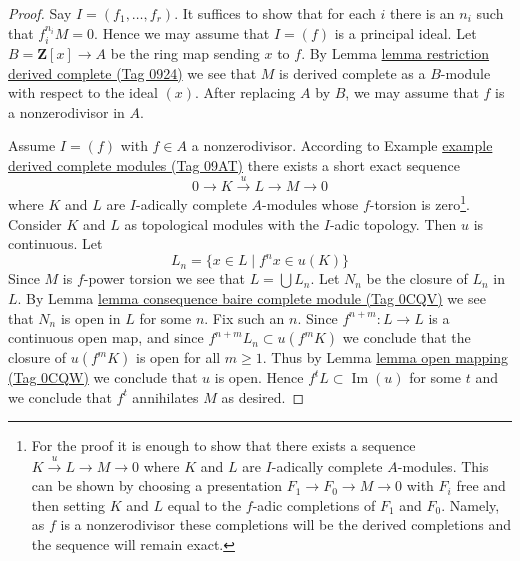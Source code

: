 \documentclass{amsart}
\theoremstyle{plain}
\theoremstyle{definition}
\theoremstyle{remark}
\numberwithin{equation}{subsection}
\def\Im{\mathop{\mathrm{Im}}}
\begin{document}
\begin{proof}
Say $I = (f_1, \ldots, f_r)$. It suffices to show
that for each $i$ there is an $n_i$ such that $f_i^{n_i}M = 0$.
Hence we may assume that $I = (f)$ is a principal ideal.
Let $B = \mathbf{Z}[x] \to A$ be the ring map sending $x$ to $f$.
By Lemma \href{https://stacks.math.columbia.edu/tag/0924}{lemma restriction derived complete (Tag 0924)}
we see that $M$ is derived complete as a $B$-module
with respect to the ideal $(x)$. After replacing $A$ by
$B$, we may assume that $f$ is a nonzerodivisor in $A$.

\medskip\noindent
Assume $I = (f)$ with $f \in A$ a nonzerodivisor.
According to Example \href{https://stacks.math.columbia.edu/tag/09AT}{example derived complete modules (Tag 09AT)}
there exists a short exact sequence
$$
0 \to K \xrightarrow{u} L \to M \to 0
$$
where $K$ and $L$ are $I$-adically complete $A$-modules
whose $f$-torsion is zero\footnote{For the proof it is enough
to show that there exists a sequence $K \xrightarrow{u} L \to M \to 0$
where $K$ and $L$ are $I$-adically complete $A$-modules. This can
be shown by choosing a presentation $F_1 \to F_0 \to M \to 0$
with $F_i$ free and then setting $K$ and $L$ equal to the
$f$-adic completions of $F_1$ and $F_0$. Namely, as $f$
is a nonzerodivisor these completions will be the
derived completions and the sequence will remain exact.}.
Consider $K$ and $L$ as
topological modules with the $I$-adic topology. Then $u$ is continuous.
Let
$$
L_n = \{x \in L \mid f^n x \in u(K)\}
$$
Since $M$ is $f$-power torsion we see that
$L = \bigcup L_n$. Let $N_n$ be the closure of $L_n$ in $L$.
By Lemma \href{https://stacks.math.columbia.edu/tag/0CQV}{lemma consequence baire complete module (Tag 0CQV)}
we see that $N_n$ is open in $L$ for some $n$. Fix such an $n$.
Since $f^{n + m} : L \to L$ is a continuous open map, and since
$f^{n + m} L_n \subset u(f^m K)$ we conclude that
the closure of $u(f^mK)$ is open for all $m \geq 1$.
Thus by Lemma \href{https://stacks.math.columbia.edu/tag/0CQW}{lemma open mapping (Tag 0CQW)}
we conclude that $u$ is open. Hence $f^tL \subset \Im(u)$
for some $t$ and we conclude that $f^t$ annihilates $M$
as desired.
\end{proof}
\end{document}
